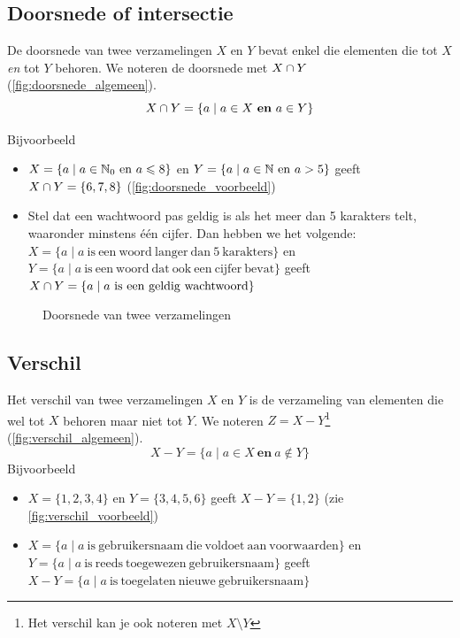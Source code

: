 \subsection{Doorsnede of intersectie}\index{\ensuremath{\intersect}}
De doorsnede van twee verzamelingen $X$ en $Y$ bevat enkel die elementen die tot $X$ \emph{en} tot $Y$ behoren. We noteren de doorsnede met $X\cap Y$ (\cref{fig:doorsnede_algemeen}).
\begin{equation*}
X\cap Y =\{a \mid a\in X ~\mathbf{en}~a\in Y \}
\end{equation*}

Bijvoorbeeld
\begin{itemize}
\item $X=\{a \mid a\in \mathbb{N}_0 ~\mathrm{en}~a\leqslant 8\}$ en $Y=\{a \mid a\in \mathbb{N} ~\mathrm{en}~a>5\}$ geeft $X\cap Y=\{6,7,8\}$ (\cref{fig:doorsnede_voorbeeld})
\item Stel dat een wachtwoord pas geldig is als het meer dan 5 karakters telt, waaronder minstens één cijfer. Dan hebben we het volgende: \\
$X=\{a\mid a ~\mathrm{is~een~woord~langer~dan~5~karakters} \}$ en \\$Y=\{a\mid a~ \mathrm{is~een~woord~dat~ook~een~cijfer~bevat } \}$ geeft \\
$X\cap Y=\{a \mid a~\mathrm{is~een~geldig~wachtwoord} \}$

\end{itemize}

\begin{figure}[htbp]
\centering
{}\qquad
\subfloat[$\{a \mid a\in \nat_0 ~\mathrm{en}~a\leqslant 8\}\intersect \{a \mid a\in \nat ~\mathrm{en}~a>5\}
	=\{6,7,8\}$]{

    \label{fig:doorsnede_voorbeeld}
}
\caption{Doorsnede van twee verzamelingen}
\end{figure}

\subsection{Verschil}
Het verschil van twee verzamelingen $X$ en $Y$ is de verzameling van elementen die wel tot $X$ behoren maar niet tot $Y$. We noteren $Z=X-Y$\footnote{Het verschil kan je ook noteren met $X\setminus Y$} (\cref{fig:verschil_algemeen}).
\begin{equation*}
X-Y=\{a\mid a\in X ~\mathbf{en}~a\not \in Y\}
\end{equation*}
Bijvoorbeeld
\begin{itemize}
  \item $X=\{1,2,3,4\}$ en $Y=\{ 3,4,5,6\}$ geeft $X-Y=\{1,2\}$ (zie \cref{fig:verschil_voorbeeld})
  \item $X=\{a\mid a ~\mathrm{is~gebruikersnaam~die~voldoet~aan~voorwaarden}\}$ en \\$Y=\{a\mid a~\mathrm{is~reeds~toegewezen~gebruikersnaam}\}$ geeft \\
        $X-Y=\{a\mid a~\mathrm{is~toegelaten~nieuwe~gebruikersnaam}\}$
\end{itemize}

